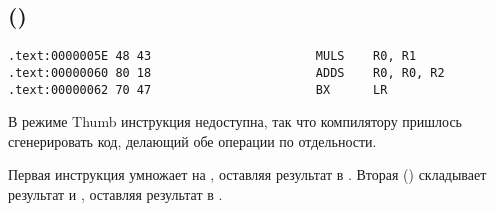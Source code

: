 \subsection{\OptimizingKeilVI (\ThumbMode)}

\begin{lstlisting}[label=ARM_leaf_example2]
.text:0000005E 48 43                       MULS    R0, R1
.text:00000060 80 18                       ADDS    R0, R0, R2
.text:00000062 70 47                       BX      LR
\end{lstlisting}

В режиме Thumb инструкция  недоступна, так что компилятору пришлось сгенерировать код, 
делающий обе операции по отдельности.

Первая инструкция  умножает  на , оставляя результат в .
Вторая () складывает результат и , оставляя результат в .

